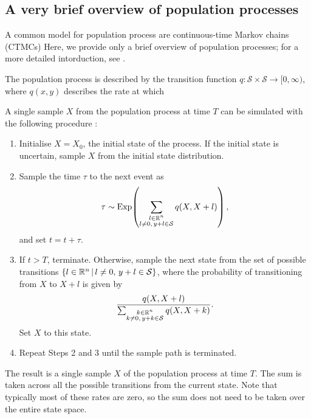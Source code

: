 \subsection{A very brief overview of population processes}
A common model for population process are continuous-time Markov chains (CTMCs)
Here, we provide only a brief overview of population processes; for a more detailed intorduction, see \citehere.

The population process is described by the transition function \(q\colon \mathcal{S}\times\mathcal{S} \to [0,\infty)\), where \(q(x,y)\) describes the rate at which

A single sample \(X\) from the population process at time \(T\) can be simulated with the following procedure \citep{Gillespie_1977_ExactStochasticSimulation}:
\begin{enumerate}
	\item Initialise \(X = X_0\), the initial state of the process.
	      If the initial state is uncertain, sample \(X\) from the initial state distribution.

	\item Sample the time \(\tau\) to the next event as
	      \[
		      \tau \sim\mathrm{Exp}\!\left(\sum_{\substack{l \in \mathbb{R}^n \\ l \neq 0,\, y + l \in \mathcal{S}}}{q\!\left(X, X + l\right)}\right),
	      \]
	      and set \(t = t + \tau\).

	\item If \(t > T\), terminate.
	      Otherwise, sample the next state from the set of possible transitions \(\left\{l \in \mathbb{R}^n\,\middle|\,l \neq 0,\, y + l \in \mathcal{S}\right\}\), where the probability of transitioning from \(X\) to \(X + l\) is given by
	      \[
		      \frac{q\!\left(X, X + l\right)}{\sum_{\substack{k \in \mathbb{R}^n \\ k \neq 0,\, y + k \in \mathcal{S}}}{q\!\left(X, X + k\right)}}.
	      \]
	      Set \(X\) to this state.

	\item Repeat Steps 2 and 3 until the sample path is terminated.

\end{enumerate}
The result is a single sample \(X\) of the population process at time \(T\).
The sum is taken across all the possible transitions from the current state.
Note that typically most of these rates are zero, so the sum does not need to be taken over the entire state space.

